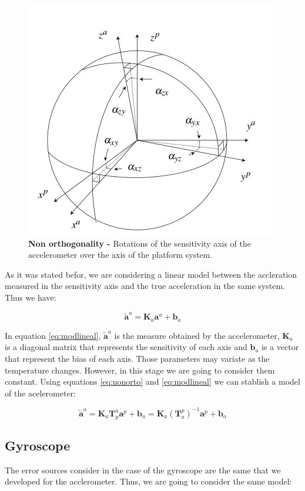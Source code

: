 \documentclass[conference]{IEEEtran}
\begin{document}
\begin{figure}
	\centering
	\includegraphics[width=.6\columnwidth]{./pics_paper/ejes_acc.jpg}
	\caption{\textbf{Non orthogonality -} Rotations of the sensitivity axis of the accelerometer over the axis of the platform system.}
	\label{fig:nonorto}
\end{figure}

As it was stated befor, we are considering a linear model between the accleration measured in the sensitivity axis and the true acceleration in the same system. Thus we have:

\begin{equation}
\tilde{\mathbf{a}}^a = \mathbf{K}_a\mathbf{a}^a + \mathbf{b}_a
\label{eq:modlineal}
\end{equation}

In equation \ref{eq:modlineal}, $\tilde{\mathbf{a}}^a$ is the measure obtained by the accelerometer, $\mathbf{K}_a$ is a diagonal matrix that represents the sensitivity of each axis and $\mathbf{b}_a$ is a vector that represent the bias of each axis. Those parameters may variate as the temperature changes. However, in this stage we are going to consider them constant. Using equations \ref{eq:nonorto} and \ref{eq:modlineal} we can stablish a model of the acelerometer:

\begin{equation}
\tilde{\mathbf{a}}^a = \mathbf{K}_a\mathbf{T}_p^a\mathbf{a}^p + \mathbf{b}_a = \mathbf{K}_a(\mathbf{T}_a^p)^{-1}\mathbf{a}^p + \mathbf{b}_a 
\end{equation}


\subsection{Gyroscope}
The error sources consider in the case of the gyroscope are the same that we developed for the acclerometer. Thus, we are going to consider the same model:
\end{document}
